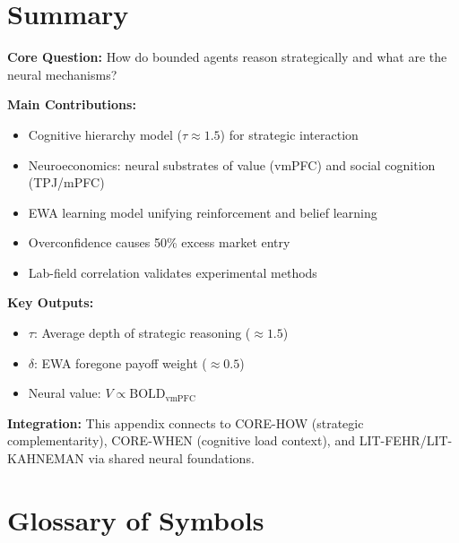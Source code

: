 \section{Summary}
\label{sec:ca-summary}

\begin{tcolorbox}[colback=green!10!white, colframe=green!75!black,
    title=\textbf{Appendix CA: Summary}]

\textbf{Core Question:} How do bounded agents reason strategically and what are the neural mechanisms?

\textbf{Main Contributions:}
\begin{itemize}[nosep]
    \item Cognitive hierarchy model ($\tau \approx 1.5$) for strategic interaction
    \item Neuroeconomics: neural substrates of value (vmPFC) and social cognition (TPJ/mPFC)
    \item EWA learning model unifying reinforcement and belief learning
    \item Overconfidence causes 50\% excess market entry
    \item Lab-field correlation validates experimental methods
\end{itemize}

\textbf{Key Outputs:}
\begin{itemize}[nosep]
    \item $\tau$: Average depth of strategic reasoning ($\approx 1.5$)
    \item $\delta$: EWA foregone payoff weight ($\approx 0.5$)
    \item Neural value: $V \propto \text{BOLD}_{\text{vmPFC}}$
\end{itemize}

\textbf{Integration:} This appendix connects to CORE-HOW (strategic complementarity),
CORE-WHEN (cognitive load context), and LIT-FEHR/LIT-KAHNEMAN via shared neural foundations.

\end{tcolorbox}


\section{Glossary of Symbols}
\label{sec:ca-glossary}

